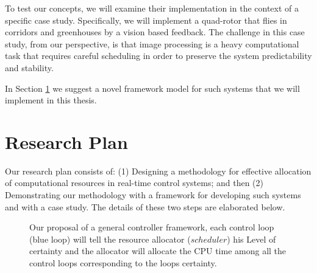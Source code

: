 \documentclass[11pt]{article}
\begin{document}
To test our concepts, we will examine their implementation in the context of a specific case study. Specifically, we will implement a quad-rotor that flies in corridors and greenhouses by a vision based feedback. The challenge in this case study, from our perspective, is that image processing is a heavy computational task that requires careful scheduling in order to preserve the system predictability and stability.

In Section \ref{sec:Research Plan} we suggest a novel framework model for such systems that we will implement in this thesis.


\section{Research Plan}
\label{sec:Research Plan}

Our research plan consists of: (1) Designing a methodology for effective allocation of computational resources in real-time control systems; and then (2) Demonstrating our methodology with a framework for developing such systems and with a case study. The details of these two steps are elaborated below.


\begin{figure}[h]
    \centering
    
    
    \caption{Our proposal of a general controller framework, each control loop (blue loop) will tell the resource allocator ($scheduler$) his Level of certainty and the allocator will allocate the CPU time among all the control loops corresponding to the loops certainty.
    \label{fig:general_hybrid_loop}}
\end{figure}
\end{document}
